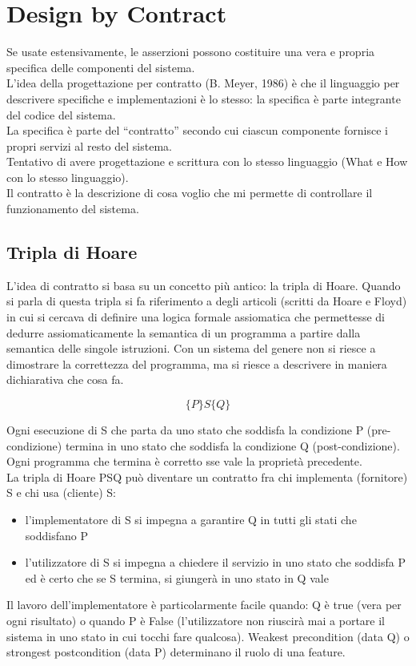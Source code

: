 \section{Design by Contract}
Se usate estensivamente, le asserzioni possono costituire una vera e propria specifica delle componenti del sistema.\\
L’idea della progettazione per contratto (B. Meyer, 1986) è che il linguaggio per descrivere specifiche e implementazioni è lo stesso: la specifica è parte integrante del codice del sistema.\\
La specifica è parte del “contratto” secondo cui ciascun componente fornisce i propri servizi al resto del sistema.\\
Tentativo di avere progettazione e scrittura con lo stesso linguaggio (What e How con lo stesso linguaggio).\\
Il contratto è la descrizione di cosa voglio che mi permette di controllare il funzionamento del sistema.

\subsection{Tripla di Hoare}
L'idea di contratto si basa su un concetto più antico: la tripla di Hoare. 
Quando si parla di questa tripla si fa riferimento a degli articoli (scritti da Hoare e Floyd) in cui si cercava di definire una logica formale assiomatica che permettesse di dedurre assiomaticamente la semantica di un programma a partire dalla semantica delle singole istruzioni. Con un sistema del genere non si riesce a dimostrare la correttezza del programma, ma si riesce a descrivere in maniera dichiarativa che cosa fa.
\begin{center}
    \[\{P\}S\{Q\}\]
\end{center}
Ogni esecuzione di S che parta da uno stato che soddisfa la condizione P (pre-condizione) termina in uno stato che soddisfa la condizione Q (post-condizione). Ogni programma che termina è corretto sse vale la proprietà precedente. \\
La tripla di Hoare {P}S{Q} può diventare un contratto fra chi implementa (fornitore) S e chi usa (cliente) S:
\begin{itemize}
    \item l'implementatore di S si impegna a garantire Q in tutti gli stati che soddisfano P
    \item l'utilizzatore di S si impegna a chiedere il servizio in uno stato che soddisfa P ed è certo che se S termina, si giungerà in uno stato in Q vale
\end{itemize}
Il lavoro dell'implementatore è particolarmente facile quando: Q è true (vera per ogni risultato) o quando P è False (l'utilizzatore non riuscirà mai a portare il sistema in uno stato in cui tocchi fare qualcosa). Weakest precondition (data Q) o strongest postcondition (data P) determinano il ruolo di una feature.


